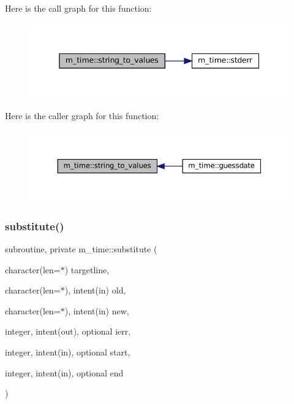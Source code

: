 Here is the call graph for this function\+:\nopagebreak
\begin{figure}[H]
\begin{center}
\leavevmode
\includegraphics[width=345pt]{namespacem__time_aa6ebf9f13e386a27257b5d207fcd3eec_cgraph}
\end{center}
\end{figure}
Here is the caller graph for this function\+:\nopagebreak
\begin{figure}[H]
\begin{center}
\leavevmode
\includegraphics[width=350pt]{namespacem__time_aa6ebf9f13e386a27257b5d207fcd3eec_icgraph}
\end{center}
\end{figure}
\mbox{\label{namespacem__time_a3c8fc82ff0a77573d0f907d4d44dd9bd}} 
\subsubsection{\texorpdfstring{substitute()}{substitute()}}
{\footnotesize\ttfamily subroutine, private m\+\_\+time\+::substitute (\begin{DoxyParamCaption}\item[{character(len=$\ast$)}]{targetline,  }\item[{character(len=$\ast$), intent(in)}]{old,  }\item[{character(len=$\ast$), intent(in)}]{new,  }\item[{integer, intent(out), optional}]{ierr,  }\item[{integer, intent(in), optional}]{start,  }\item[{integer, intent(in), optional}]{end }\end{DoxyParamCaption})\hspace{0.3cm}{\ttfamily [private]}}



